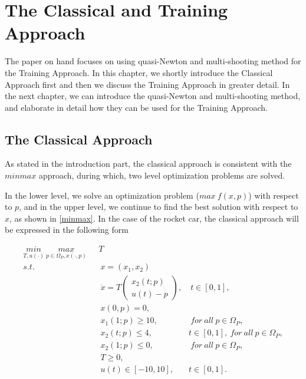 

\chapter{The Classical and Training Approach}

The paper on hand focuses on using quasi-Newton and multi-shooting method for the Training Approach. In this chapter, we shortly introduce the Classical Approach first and then we discuss the Training Approach in greater detail. In the next chapter, we can introduce the quasi-Newton and multi-shooting method, and elaborate in detail how they can be used for the Training Approach. 



\section{The Classical Approach}

As stated in the introduction part, the classical approach is consistent with the $minmax$ approach, during which, two level optimization problems are solved. 

In the lower level, we solve an optimization problem ($max \  f(x,p)$) with respect to $p$, and in the upper level, we continue to find the best solution with respect to $x$, as shown in \ref{minmax}. In the case of the rocket car, the classical approach will be expressed in the following form

\begin{subequations}
	\begin{align}
		\underset{T, u(\cdot)}{min} \  \underset{ p \in \Omega_P, x(\cdot,p)}{max}  \ \   & \  T \\ 
		s.t.  & \ \ x = (x_1, x_2)   \label{ca_rc_x} \\ 
		& \ \  \dot{x} = T  \begin{pmatrix}  x_2(t;p) \\ u(t)-p   \end{pmatrix}, & \ t \in [0,1],  \label{ca_rc_partial} \\
		& \ \ x(0,p) = 0, \label{ca_rc_t0}\\
		& \ \ x_1(1;p) \geq 10, & \ for \ all \ p \in \Omega_P, \label{ca_rc_x1_t1} \\
		& \ \ x_2(t;p) \leq 4, & t \in [0,1], \ for \ all \ p \in \Omega_P,  \label{ca_rc_x2_tc} \\
		& \ \ x_2(1;p) \leq 0, & \ for \ all \ p \in \Omega_P, \label{ca_rc_x2_t1}  \\
		& \ \ T \geq 0, \\
		& \ \ u(t) \in [-10, 10], & t \in [0,1]. 
	\end{align}
	\label{ca_rc}
\end{subequations}

